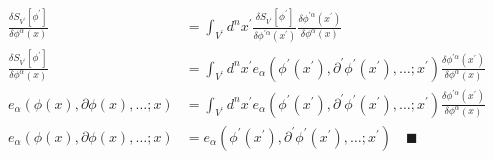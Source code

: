 \documentclass{article}
\begin{document}
\begin{align*}
	\frac{\delta S_{V^\prime} \left[\phi^\prime\right]}{\delta \phi^{\alpha}(x)} &= \int_{V^\prime}d^nx^\prime \frac{\delta S_{V^\prime} \left[\phi^\prime\right]}{\delta \phi^{\prime \alpha}(x^\prime)} \frac{\delta \phi^{\prime \alpha}(x^\prime)}{\delta \phi^{\alpha}(x)} \\
	\frac{\delta S_{V^\prime} \left[\phi^\prime\right]}{\delta \phi^{\alpha}(x)} &= \int_{V^\prime}d^nx^\prime e_\alpha\left(\phi^\prime(x^\prime),\partial^\prime \phi^\prime(x^\prime), \dots ; x^\prime \right) \frac{\delta \phi^{\prime \alpha}(x^\prime)}{\delta \phi^{\alpha}(x)} \\
	e_{\alpha}(\phi(x),\partial\phi(x),\ldots ; x) &= \int_{V^\prime}d^nx^\prime e_\alpha\left(\phi^\prime(x^\prime),\partial^\prime \phi^\prime(x^\prime), \dots ; x^\prime \right) \frac{\delta \phi^{\prime \alpha}(x^\prime)}{\delta \phi^{\alpha}(x)} \\
	e_{\alpha}(\phi(x),\partial\phi(x),\ldots ; x) &= e_\alpha\left(\phi^\prime(x^\prime),\partial^\prime \phi^\prime(x^\prime), \dots ; x^\prime \right) \quad \blacksquare
\end{align*}
\end{document}
